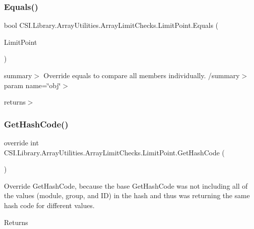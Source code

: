 \subsubsection{\texorpdfstring{Equals()}{Equals()}}
{\footnotesize\ttfamily bool C\+S\+I.\+Library.\+Array\+Utilities.\+Array\+Limit\+Checks.\+Limit\+Point.\+Equals (\begin{DoxyParamCaption}\item[{\mbox{\hyperlink{class_c_s_i_1_1_library_1_1_array_utilities_1_1_array_limit_checks_1_1_limit_point}{Limit\+Point}}}]{Limit\+Point }\end{DoxyParamCaption})\hspace{0.3cm}{\ttfamily [inline]}}

summary$>$ Override equals to compare all members individually. /summary$>$ param name=\char`\"{}obj\char`\"{}$>$

returns$>$\mbox{\label{class_c_s_i_1_1_library_1_1_array_utilities_1_1_array_limit_checks_1_1_limit_point_a5ad861288e1ad6b8c772dd022e8fb48b}} 
\subsubsection{\texorpdfstring{GetHashCode()}{GetHashCode()}}
{\footnotesize\ttfamily override int C\+S\+I.\+Library.\+Array\+Utilities.\+Array\+Limit\+Checks.\+Limit\+Point.\+Get\+Hash\+Code (\begin{DoxyParamCaption}{ }\end{DoxyParamCaption})\hspace{0.3cm}{\ttfamily [inline]}}



Override Get\+Hash\+Code, because the base Get\+Hash\+Code was not including all of the values (module, group, and ID) in the hash and thus was returning the same hash code for different values. 

\begin{DoxyReturn}{Returns}

\end{DoxyReturn}
\mbox{\label{class_c_s_i_1_1_library_1_1_array_utilities_1_1_array_limit_checks_1_1_limit_point_afb6b7605ba69f3a6f9f8c3547f026b60}} 
